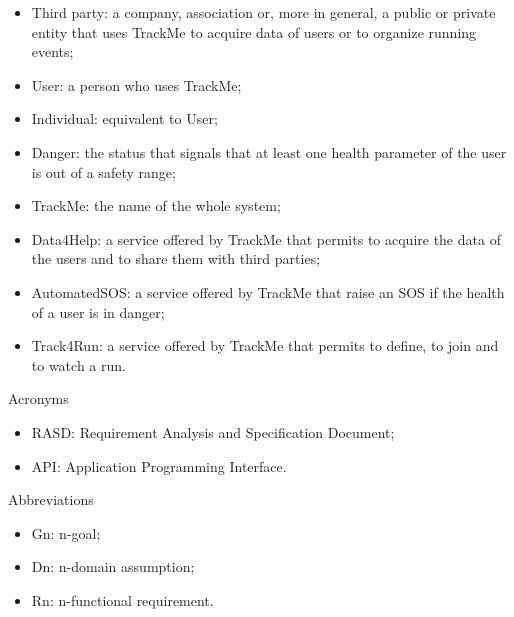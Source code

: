 \documentclass{article}
\begin{document}
\begin{legal}
\begin{legal}
\begin{legal}
{\begin{itemize}
				\item Third party: a company, association or, more in general, a public or private entity that uses TrackMe to acquire data of users or to organize running events;\\
				\item User: a person who uses TrackMe;\\
				\item Individual: equivalent to User;\\
				\item Danger: the status that signals that at least one health parameter of the user is out of a safety range;\\
				\item TrackMe: the name of the whole system;\\
				\item Data4Help: a service offered by TrackMe that permits to acquire the data of the users and to share them with third parties;\\
				\item AutomatedSOS: a service offered by TrackMe that raise an SOS if the health of a user is in danger;\\
				\item Track4Run: a service offered by TrackMe that permits to define, to join and to watch a run.\\
				\end{itemize}
			}	
			\item Acronyms\\
			{\normalfont	
				\begin{itemize}
				\item RASD: Requirement Analysis and Specification Document;\\
				\item API: Application Programming Interface.\\
				\end{itemize}
			}
			\item Abbreviations\\
			{\normalfont	
				\begin{itemize}
				\item Gn: n-goal;\\
				\item Dn: n-domain assumption;\\
				\item Rn: n-functional requirement.\\
				\end{itemize}
			}
			\end{legal}

\end{legal}
\end{legal}
\end{document}
